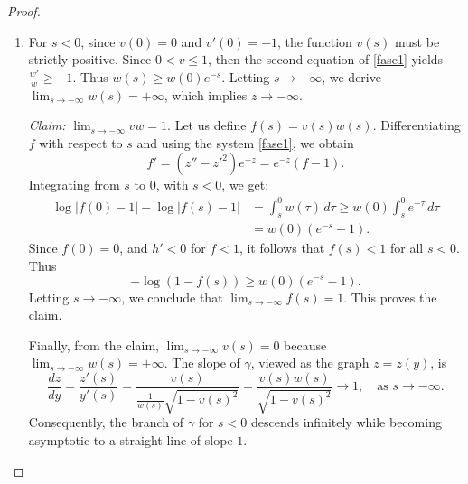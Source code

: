 \documentclass[10pt,a4paper]{amsart}
\begin{document}
\begin{proof}
\begin{enumerate}
\item For $s < 0$, since $v(0)=0$ and $v'(0)=-1$, the function $v(s)$ must be strictly positive. Since $0<v\leq 1$, then the second equation of \eqref{fase1} yields $\frac{w'}{w}\geq -1$. Thus $w(s)\geq w(0)e^{-s}$. Letting $s\to-\infty$, we derive $\lim_{s\to-\infty}w(s)=+\infty$, which implies $z \to -\infty$. 

{\it Claim:} $\lim_{s \to -\infty} vw = 1$. Let us define $f(s) = v(s)w(s)$. Differentiating $f$ with respect to $s$ and using the system \eqref{fase1}, we obtain
$$f'=(z''-z'^2)e^{-z}=e^{-z}(f-1).$$
 Integrating from $s$ to $0$, with $s < 0$, we get:
\begin{equation*}
\begin{split}
 \log|f(0) - 1| - \log|f(s) - 1| &= \int_{s}^{0} w(\tau) \, d\tau \geq w(0) \int_{s}^{0} e^{-\tau} \, d\tau\\
 &=w(0)(e^{-s}-1).
 \end{split}
 \end{equation*}
Since $f(0) = 0$, and $h'<0$ for $f<1$, it follows that $f(s) < 1$ for all $s < 0$. Thus
$$ -\log(1 - f(s)) \geq w(0)(e^{-s}-1).$$
Letting $s\to-\infty$, we conclude that $\lim_{s \to -\infty} f(s) = 1$. This proves the claim. 

Finally, from the claim, $\lim_{s\to -\infty}v(s) = 0$ because $\lim_{s\to-\infty}w(s)=+\infty$. The slope of $\gamma$, viewed as the graph $z=z(y)$, is
$$ \frac{dz}{dy} = \frac{z'(s)}{y'(s)} = \frac{v(s)}{ \frac{1}{w(s)} \sqrt{1-v(s)^2}} = \frac{v(s)w(s)}{\sqrt{1-v(s)^2}} \to 1,\quad\mbox{as $s\to-\infty$}.$$
Consequently, the branch of $\gamma$ for $s<0$ descends infinitely while becoming asymptotic to a straight line of slope $1$.
 
\end{enumerate}
\end{proof}
\end{document}
